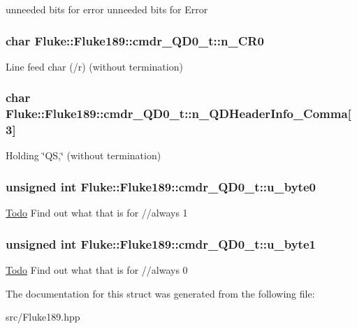 unneeded bits for error unneeded bits for Error \hypertarget{structFluke_1_1Fluke189_1_1cmdr__QD0__t_a052cc7ae576b3634f2eb8e1a4587c29e}{
\subsubsection[{n\_\-CR0}]{\setlength{\rightskip}{0pt plus 5cm}char {\bf Fluke::Fluke189::cmdr\_\-QD0\_\-t::n\_\-CR0}}}
\label{structFluke_1_1Fluke189_1_1cmdr__QD0__t_a052cc7ae576b3634f2eb8e1a4587c29e}
Line feed char (/r) (without termination) \hypertarget{structFluke_1_1Fluke189_1_1cmdr__QD0__t_adbec2e8d0ea53d60baa33f2bad91e272}{
\subsubsection[{n\_\-QDHeaderInfo\_\-Comma}]{\setlength{\rightskip}{0pt plus 5cm}char {\bf Fluke::Fluke189::cmdr\_\-QD0\_\-t::n\_\-QDHeaderInfo\_\-Comma}\mbox{[}3\mbox{]}}}
\label{structFluke_1_1Fluke189_1_1cmdr__QD0__t_adbec2e8d0ea53d60baa33f2bad91e272}
Holding \char`\"{}QS,\char`\"{} (without termination) \hypertarget{structFluke_1_1Fluke189_1_1cmdr__QD0__t_a8255c6d6c66768208d4a020146369013}{
\subsubsection[{u\_\-byte0}]{\setlength{\rightskip}{0pt plus 5cm}unsigned {\bf int} {\bf Fluke::Fluke189::cmdr\_\-QD0\_\-t::u\_\-byte0}}}
\label{structFluke_1_1Fluke189_1_1cmdr__QD0__t_a8255c6d6c66768208d4a020146369013}
\begin{Desc}
\item[\hyperlink{todo__todo000015}{Todo}]Find out what that is for //always 1 \end{Desc}
\hypertarget{structFluke_1_1Fluke189_1_1cmdr__QD0__t_a835768e5aabd53d41e1e7a4d10fdde1f}{
\subsubsection[{u\_\-byte1}]{\setlength{\rightskip}{0pt plus 5cm}unsigned {\bf int} {\bf Fluke::Fluke189::cmdr\_\-QD0\_\-t::u\_\-byte1}}}
\label{structFluke_1_1Fluke189_1_1cmdr__QD0__t_a835768e5aabd53d41e1e7a4d10fdde1f}
\begin{Desc}
\item[\hyperlink{todo__todo000016}{Todo}]Find out what that is for //always 0 \end{Desc}


The documentation for this struct was generated from the following file:\begin{DoxyCompactItemize}
\item 
src/Fluke189.hpp\end{DoxyCompactItemize}
